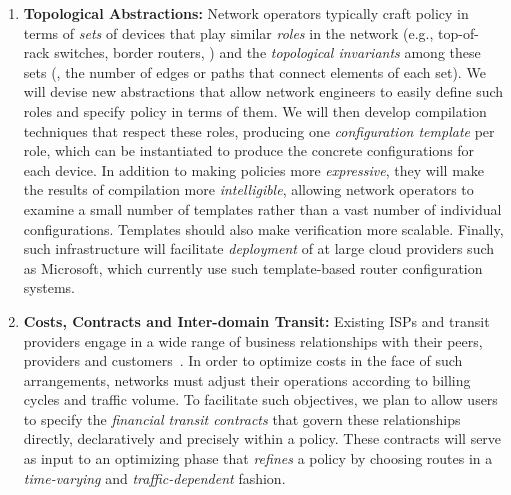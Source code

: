 \begin{enumerate}

\item {\bf Topological Abstractions:} Network operators typically craft policy in terms of \emph{sets} of devices that
play similar \emph{roles} in the network (e.g., top-of-rack switches, border routers, \etc) and the  \emph{topological invariants} among these sets (\eg, the number of edges or paths that connect elements of each set).  We will devise new abstractions that allow network engineers to easily define such roles and specify policy in terms of them.  We will then develop compilation techniques that respect these roles, producing one {\em configuration template} per role, which can be instantiated to produce the concrete configurations for each device.  
In addition to making policies more \emph{expressive},
they will make the results of compilation more \emph{intelligible}, allowing
network operators to examine a small number of templates
rather than a vast number of individual configurations.  Templates should
also make verification more scalable.  Finally,
such infrastructure will facilitate \emph{deployment} of \Name
at large cloud providers such as Microsoft, which currently use such
template-based router configuration systems.

\item {\bf Costs, Contracts and Inter-domain Transit:} 
Existing ISPs and transit providers engage in a wide range of business
relationships with their peers, providers and customers~\cite{routingplaybook}.
In order to optimize costs in the face of such arrangements, networks
must adjust their operations according to billing cycles and traffic
volume.  To facilitate such objectives, we plan to
allow users to specify the 
\emph{financial transit contracts} that govern these relationships
directly, declaratively and precisely within a \Name policy.
These contracts will serve as input to an optimizing phase that \emph{refines}
a \Name policy by choosing routes in a \emph{time-varying} and \emph{traffic-dependent}
fashion.



\end{enumerate}
